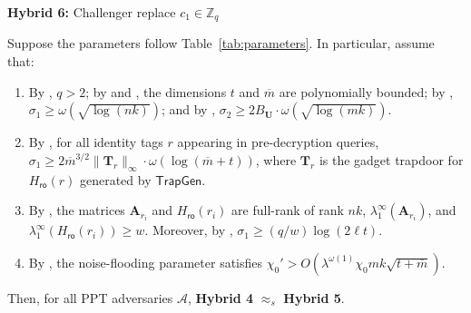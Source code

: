\noindent\textbf{Hybrid 6:} Challenger replace $c_1 \in \mathbb{Z}_q$

\noindent\begin{lemma}
Suppose the parameters follow Table~\ref{tab:parameters}. In particular,
assume that:
\begin{enumerate}
    \item By , $q>2$; by
     and , the dimensions
    $t$ and $\overline m$ are polynomially bounded; by
    , $\sigma_1\ge \omega(\sqrt{\log(nk)})$;
    and by ,
    $\sigma_2 \ge 2B_{\mathbf U}\cdot \omega(\sqrt{\log(mk)})$.

    \item By , for all identity tags $r$ appearing
    in pre-decryption queries,
    $\sigma_1
    \ge
    2\overline m^{3/2}\|\mathbf T_r\|_{\infty}
    \cdot \omega(\log(\overline m+t))$,
    where $\mathbf T_r$ is the gadget trapdoor for
    $H_{\mathsf{ro}}(r)$ generated by $\mathsf{TrapGen}$.

    \item By , the matrices $\mathbf A_{r_i}$ and
    $H_{\mathsf{ro}}(r_i)$ are full-rank of rank $nk$,
    $\lambda_1^\infty(\mathbf A_{r_i})$, and $
    \lambda_1^\infty(H_{\mathsf{ro}}(r_i))\ge w$.
    Moreover, by ,
    $\sigma_1\ge (q/w)\log(2\ell t)$.

    \item By , the noise-flooding parameter
    satisfies
    $\chi_0'
    >
    O(\lambda^{\omega(1)}\chi_0mk\sqrt{t+\overline m})$.
\end{enumerate}
Then, for all PPT adversaries $\mathcal A$,
\textbf{Hybrid 4} $\approx_s$ \textbf{Hybrid 5}.
\end{lemma}

